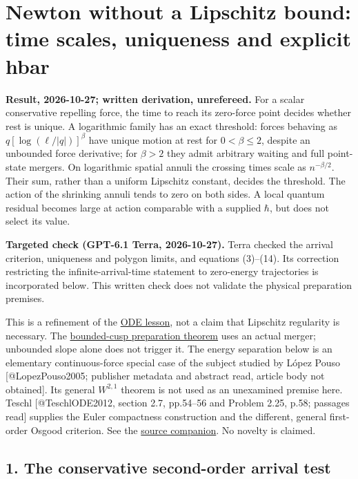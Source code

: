 \documentclass[11pt,a4paper]{article}
\begin{document}
\section{Newton without a Lipschitz bound: time scales, uniqueness and
explicit
hbar}\label{newton-without-a-lipschitz-bound-time-scales-uniqueness-and-explicit-hbar}

\textbf{Result, 2026-10-27; written derivation, unrefereed.} For a
scalar conservative repelling force, the time to reach its zero-force
point decides whether rest is unique. A logarithmic family has an exact
threshold: forces behaving as \(q[\log(\ell/|q|)]^\beta\) have unique
motion at rest for \(0<\beta\le2\), despite an unbounded force
derivative; for \(\beta>2\) they admit arbitrary waiting and full
point-state mergers. On logarithmic spatial annuli the crossing times
scale as \(n^{-\beta/2}\). Their sum, rather than a uniform Lipschitz
constant, decides the threshold. The action of the shrinking annuli
tends to zero on both sides. A local quantum residual becomes large at
action comparable with a supplied \(\hbar\), but does not select its
value.

\textbf{Targeted check (GPT-6.1 Terra, 2026-10-27).} Terra checked the
arrival criterion, uniqueness and polygon limits, and equations
(3)--(14). Its correction restricting the infinite-arrival-time
statement to zero-energy trajectories is incorporated below. This
written check does not validate the physical preparation premises.

This is a refinement of the \href{balaban-ode-lesson.md}{ODE lesson},
not a claim that Lipschitz regularity is necessary. The
\href{newton-cusp-preparation-floor.md}{bounded-cusp preparation
theorem} uses an actual merger; unbounded slope alone does not trigger
it. The energy separation below is an elementary continuous-force
special case of the subject studied by López Pouso {[}@LopezPouso2005;
publisher metadata and abstract read, article body not obtained{]}. Its
general \(W^{2,1}\) theorem is not used as an unexamined premise here.
Teschl {[}@TeschlODE2012, section 2.7, pp.54--56 and Problem 2.25, p.58;
passages read{]} supplies the Euler compactness construction and the
different, general first-order Osgood criterion. See the
\href{../docs/Teschl_ODE_2012.md}{source companion}. No novelty is
claimed.

\subsection{1. The conservative second-order arrival
test}\label{the-conservative-second-order-arrival-test}
\end{document}
